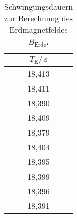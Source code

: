 \begin{table}[htp]
	\centering
	\begin{tabular}{c}
	\toprule
	{$T_\text{E}/\:\si{\second}$}\\
	\midrule
18,413\\
18,411\\
18,390\\
18,409\\
18,379\\
18,404\\
18,395\\
18,399\\
18,396\\
18,391\\
	\bottomrule
	\end{tabular}
	\caption{Schwingungsdauern zur Berechnung des Erdmagnetfeldes $B_\text{Erde}$.}
	\label{tab:T_E}
\end{table}